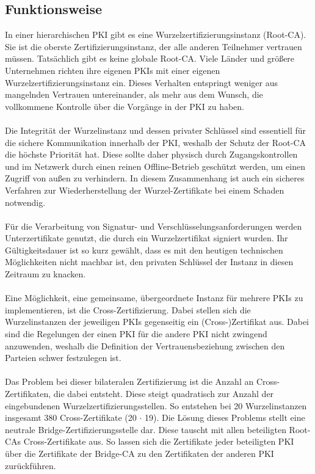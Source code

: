 \subsection{Funktionsweise}
In einer hierarchischen PKI gibt es eine Wurzelzertifizierungsinstanz (Root-CA). Sie ist die oberste Zertifizierungsinstanz, der alle anderen Teilnehmer
vertrauen müssen. Tatsächlich gibt es keine globale Root-CA. Viele Länder und größere Unternehmen richten ihre eigenen PKIs mit einer eigenen Wurzelzertifizierungsinstanz ein. Dieses Verhalten entspringt weniger aus mangelnden Vertrauen untereinander, als mehr aus dem Wunsch, die vollkommene Kontrolle über die Vorgänge in der PKI zu haben.\\
\\
Die Integrität der Wurzelinstanz und dessen privater Schlüssel sind essentiell für die sichere Kommunikation innerhalb der PKI, weshalb der Schutz der Root-CA die höchste Priorität hat. Diese sollte daher physisch durch Zugangskontrollen und im Netzwerk durch einen reinen Offline-Betrieb geschützt werden, um einen Zugriff von außen zu verhindern. In diesem Zusammenhang ist auch ein sicheres Verfahren zur Wiederherstellung der Wurzel-Zertifikate bei einem Schaden notwendig.\\
\\
Für die Verarbeitung von Signatur- und Verschlüsselungsanforderungen werden Unterzertifikate genutzt, die durch ein Wurzelzertifikat signiert wurden. Ihr Gültigkeitsdauer ist so kurz gewählt, dass es mit den heutigen technischen Möglichkeiten nicht machbar ist, den privaten Schlüssel der Instanz in diesen Zeitraum zu knacken.\\
\\
Eine Möglichkeit, eine gemeinsame, übergeordnete Instanz für mehrere PKIs zu implementieren, ist die Cross-Zertifizierung. Dabei stellen sich die Wurzelinstanzen der jeweiligen PKIs gegenseitig ein (Cross-)Zertifikat aus. Dabei sind die Regelungen der einen PKI für die andere PKI nicht zwingend anzuwenden, weshalb die Definition der Vertrauensbeziehung zwischen den Parteien schwer festzulegen ist.\\
\\
Das Problem bei dieser bilateralen Zertifizierung ist die Anzahl an Cross-Zertifikaten, die dabei entsteht. Diese steigt quadratisch zur Anzahl der eingebundenen Wurzelzertifizierungsstellen. So entstehen bei 20 Wurzelinstanzen insgesamt 380 Cross-Zertifikate (20 $\cdot$ 19). Die Lösung dieses Problems stellt eine neutrale Bridge-Zertifizierungsstelle dar. Diese tauscht mit allen beteiligten Root-CAs Cross-Zertifikate aus. So lassen sich die Zertifikate jeder beteiligten PKI über die Zertifikate der Bridge-CA zu den Zertifikaten der anderen PKI zurückführen.\\
